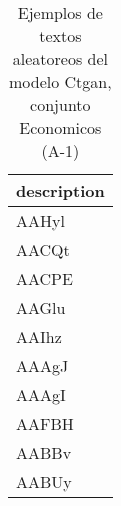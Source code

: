 \begin{table}[H]
\centering
\fontsize{8}{14}\selectfont
\caption{Ejemplos de textos aleatoreos del modelo Ctgan, conjunto Economicos (A-1)}
\label{table-sample10-economicos-a-1-ctgan-text}
\begin{tabular}{|m{50em}|}
\hline
\rowcolor[gray]{0.8}
description \\
\hline AAHyl \\
\hline AACQt \\
\hline AACPE \\
\hline AAGlu \\
\hline AAIhz \\
\hline AAAgJ \\
\hline AAAgI \\
\hline AAFBH \\
\hline AABBv \\
\hline AABUy \\
\hline
\end{tabular}
\end{table}
